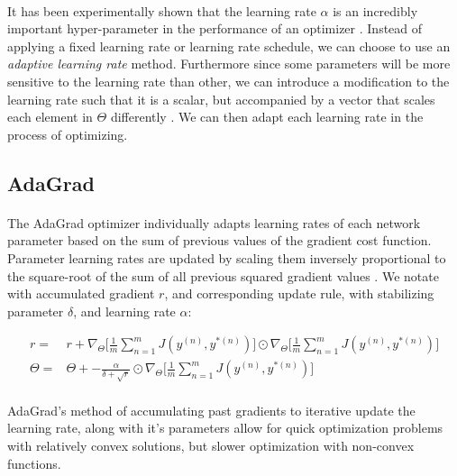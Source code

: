 \documentclass[12pt,letterpaper]{article}
\begin{document}
\paragraph*{}It has been experimentally shown that the learning rate $\alpha$ is an incredibly important hyper-parameter in the performance of an optimizer \cite{Geron}. Instead of applying a fixed learning rate or learning rate schedule, we can choose to use an \textit{adaptive learning rate} method. Furthermore since some parameters will be more sensitive to the learning rate than other, we can introduce a modification to the learning rate such that it is a scalar, but accompanied by a vector that scales each element in $\Theta$ differently \cite{Goodfellow}. We can then adapt each learning rate in the process of optimizing.

\subsection{AdaGrad}

\paragraph*{}The AdaGrad optimizer individually adapts learning rates of each network parameter based on the sum of previous values of the gradient cost function. Parameter learning rates are updated by scaling them inversely proportional to the square-root of the sum of all previous squared gradient values \cite{Goodfellow}. We notate with accumulated gradient $r$,  and corresponding update rule, with stabilizing parameter $\delta$, and learning rate $\alpha$:

\begin{equation}
\label{AdaGrad update}
\begin{split}
r =& r + \nabla_{\Theta} \Big[ \frac{1}{m} \sum_{n=1}^{m} J(y^{(n)},y^{*(n)}) \Big] 
\odot \nabla_{\Theta} \Big[ \frac{1}{m} \sum_{n=1}^{m} J(y^{(n)},y^{*(n)}) \Big] \\
\Theta =& \Theta + -\frac{\alpha}{\delta + \sqrt{r}} \odot \nabla_{\Theta} \Big[ \frac{1}{m} \sum_{n=1}^{m} J(y^{(n)},y^{*(n)}) \Big] 
\end{split}
\end{equation}

\paragraph*{}AdaGrad's method of accumulating past gradients to iterative update the learning rate, along with it's parameters allow for quick optimization problems with relatively convex solutions, but slower optimization with non-convex functions.
\end{document}
